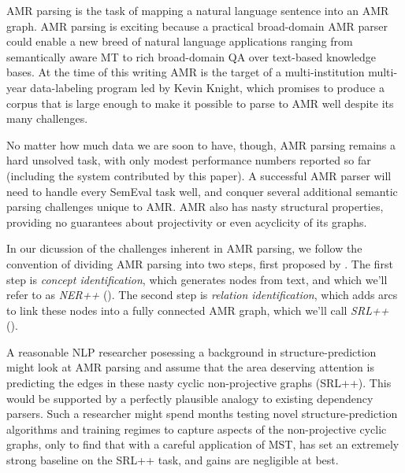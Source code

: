 \documentclass[11pt]{article}
\begin{document}
AMR parsing is the task of mapping a natural language sentence into an AMR graph.
AMR parsing is exciting because a practical broad-domain AMR parser could enable a new breed of natural language applications ranging from semantically aware MT to rich broad-domain QA over text-based knowledge bases.
At the time of this writing AMR is the target of a multi-institution multi-year data-labeling program led by Kevin Knight, which promises to produce a corpus that is large enough to make it possible to parse to AMR well despite its many challenges.


No matter how much data we are soon to have, though, AMR parsing remains a hard unsolved task, with only modest performance numbers reported so far (including the system contributed by this paper).
A successful AMR parser will need to handle every SemEval task well, and conquer several additional semantic parsing challenges unique to AMR.
AMR also has nasty structural properties, providing no guarantees about projectivity or even acyclicity of its graphs.

In our dicussion of the challenges inherent in AMR parsing, we follow the convention of dividing AMR parsing into two steps, first proposed by \cite{key:2014flanigan-amr}. 
The first step is \textit{concept identification}, which generates nodes from text, and which we'll refer to as \textit{NER++} (). 
The second step is \textit{relation identification}, which adds arcs to link these nodes into a fully connected AMR graph, which we'll call \textit{SRL++} ().

A reasonable NLP researcher posessing a background in structure-prediction might look at AMR parsing and assume that the area deserving attention is predicting the edges in these nasty cyclic non-projective graphs (SRL++).
This would be supported by a perfectly plausible analogy to existing dependency parsers.
Such a researcher might spend months testing novel structure-prediction algorithms and training regimes to capture aspects of the non-projective cyclic graphs, only to find that with a careful application of MST, \cite{key:2014flanigan-amr} has set an extremely strong baseline on the SRL++ task, and gains are negligible at best.
\end{document}
